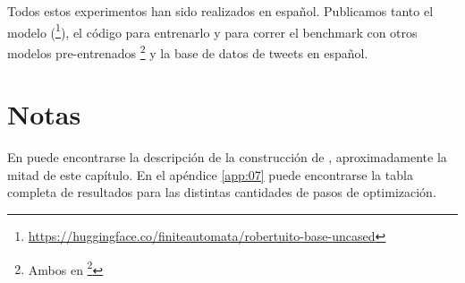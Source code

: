 Todos estos experimentos han sido realizados en español. Publicamos tanto el modelo \robertuito{}(\footnote{\url{https://huggingface.co/finiteautomata/robertuito-base-uncased}}), el código para entrenarlo y para correr el benchmark con otros modelos pre-entrenados \footnote{Ambos en  \footnote{\url{https://github.com/pysentimiento/robertuito}}}  y la base de datos de tweets en español.

\section{Notas}

En \citet{perez2021robertuito} puede encontrarse la descripción de la construcción de \robertuito{}, aproximadamente la mitad de este capítulo. En el apéndice \ref{app:07} puede encontrarse la tabla completa de resultados para las distintas cantidades de pasos de optimización.

